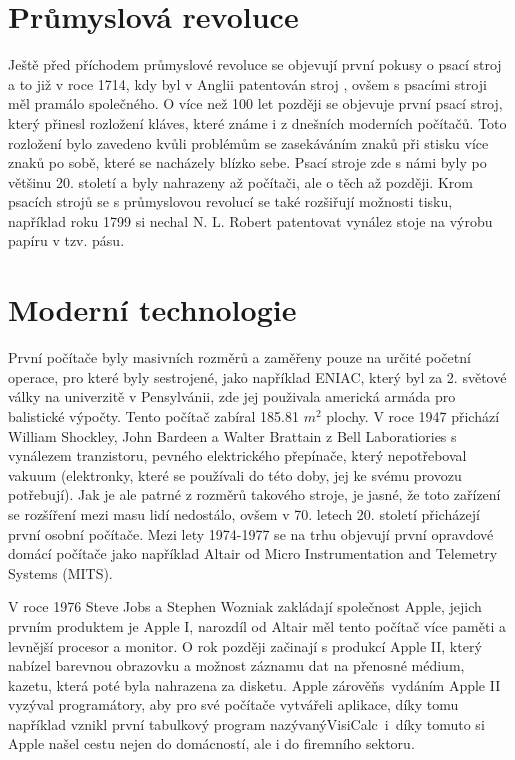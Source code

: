 \section{Průmyslová revoluce}

Ještě před příchodem průmyslové revoluce se objevují první pokusy o psací stroj a to již v roce 1714, kdy byl v Anglii patentován stroj
 \cite{FirstTypewriter}, ovšem s psacími stroji měl pramálo společného. O více než 100 let později se
objevuje první psací stroj, který přinesl rozložení kláves, které známe i z dnešních moderních počítačů. Toto rozložení bylo zavedeno kvůli
problémům se zasekáváním znaků při stisku více znaků po sobě, které se nacházely blízko sebe. Psací stroje zde s námi byly po většinu 20. století
a byly nahrazeny až počítači, ale o těch až později. Krom psacích strojů se s průmyslovou revolucí se také rozšiřují možnosti tisku, například roku 1799
si nechal N. L. Robert patentovat vynález stoje na výrobu papíru v tzv.  pásu. \cite{Papir}

\section{Moderní technologie}

První počítače byly masivních rozměrů a zaměřeny pouze na určité početní operace, pro které byly sestrojené, jako například ENIAC, který byl za 2.
světové války na univerzitě v Pensylvánii, zde jej použivala americká armáda pro balistické výpočty. Tento počítač zabíral 185.81 $ m^2 $ plochy. \cite{historyComp} V roce
1947 přichází William Shockley, John Bardeen a Walter Brattain z Bell Laboratiories s vynálezem tranzistoru, pevného elektrického přepínače, který nepotřeboval
vakuum \cite{liveScience} (elektronky, které se používali do této doby, jej ke svému provozu potřebují). Jak je ale patrné z rozměrů takového stroje, je jasné,
že toto zařízení se rozšíření mezi masu lidí nedostálo, ovšem v 70. letech 20. století přicházejí první osobní počítače. Mezi lety 1974-1977 se na trhu objevují
první opravdové domácí počítače jako například Altair od Micro Instrumentation and Telemetry Systems (MITS). \cite{liveScience}

V roce 1976 Steve Jobs a Stephen Wozniak zakládají společnost Apple, jejich prvním produktem je Apple I, narozdíl od Altair měl tento počítač více paměti a levnější
procesor a monitor. O rok později začinají s produkcí Apple II, který nabízel barevnou obrazovku a možnost záznamu dat na přenosné médium, kazetu, která poté byla
nahrazena za disketu. Apple zárověň\linebreak s~vydáním Apple II vyzýval programátory, aby pro své počítače vytvářeli aplikace, díky tomu například vznikl první tabulkový program
nazývaný\linebreak VisiCalc~i~díky tomuto si Apple našel cestu nejen do domácností, ale i do firemního sektoru. \cite{liveScience}
 \cite{liveScience}


